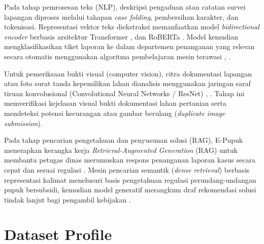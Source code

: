 \documentclass[conference]{IEEEtran}
\begin{document}
Pada tahap pemrosesan teks (NLP), deskripsi pengaduan atau catatan survei lapangan diproses melalui tahapan \textit{case folding}, pembersihan karakter, dan tokenisasi. Representasi vektor teks diekstraksi memanfaatkan model \textit{bidirectional encoder} berbasis arsitektur Transformer \cite{b3}, \cite{b4} dan RoBERTa \cite{b9}. Model kemudian mengklasifikasikan tiket laporan ke dalam departemen penanganan yang relevan secara otomatis menggunakan algoritma pembelajaran mesin terawasi \cite{b8}, \cite{b17}.

Untuk pemeriksaan bukti visual (computer vision), citra dokumentasi lapangan atau foto surat tanda kepemilikan lahan dianalisis menggunakan jaringan saraf tiruan konvolusional (Convolutional Neural Networks / ResNet) \cite{b6}, \cite{b7}. Tahap ini memverifikasi kejelasan visual bukti dokumentasi lahan pertanian serta mendeteksi potensi kecurangan atau gambar berulang (\textit{duplicate image submission}).

Pada tahap pencarian pengetahuan dan penyusunan solusi (RAG), E-Pupuk menerapkan kerangka kerja \textit{Retrieval-Augmented Generation} (RAG) untuk membantu petugas dinas merumuskan respons penanganan laporan kasus secara cepat dan sesuai regulasi \cite{b11}. Mesin pencarian semantik (\textit{dense retrieval}) berbasis representasi kalimat \cite{b10} menelusuri basis pengetahuan regulasi perundang-undangan pupuk bersubsidi, kemudian model generatif merangkum draf rekomendasi solusi tindak lanjut bagi pengambil kebijakan \cite{b5}.

\section{Dataset Profile}
\label{sec:dataset_profile}
\end{document}
